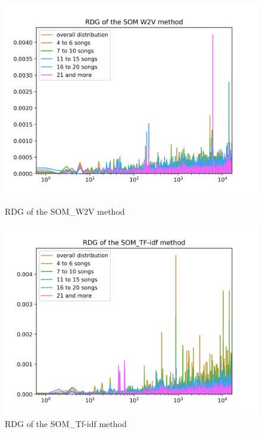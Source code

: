 \begin{figure}[h]
\centering
\begin{minipage}{.45\textwidth}
  \centering
  	\includegraphics[width=1\linewidth]{./img/som_w2v_graph.png}
	\caption{RDG of the SOM\_W2V method}
	\label{fig:som_distribution}
\end{minipage}%
 \vspace{1cm}
\begin{minipage}{.45\textwidth}
  \centering
  \includegraphics[width=1\linewidth]{./img/som_tf_idf_graph.png}
  \caption{RDG of the SOM\_Tf-idf method}
  \label{fig:som_tf_idf_distribution}
\end{minipage}
\end{figure}

